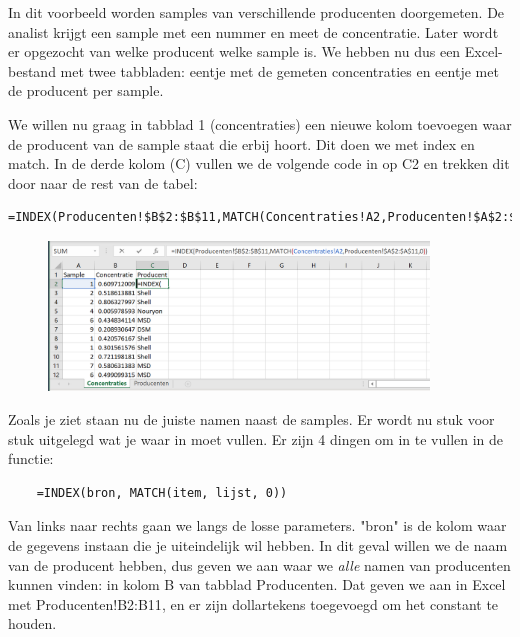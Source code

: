 \begin{figure}[h]
\begin{minipage}{0.45\textwidth}
    \end{minipage}
\end{figure}

In dit voorbeeld worden samples van verschillende producenten doorgemeten. De analist krijgt een sample met een nummer en meet de concentratie. Later wordt er opgezocht van welke producent welke sample is. We hebben nu dus een Excel-bestand met twee tabbladen: eentje met de gemeten concentraties en eentje met de producent per sample.

We willen nu graag in tabblad 1 (concentraties) een nieuwe kolom toevoegen waar de producent van de sample staat die erbij hoort. Dit doen we met index en match. In de derde kolom (C) vullen we de volgende code in op C2 en trekken dit door naar de rest van de tabel:
\begin{verbatim}
=INDEX(Producenten!$B$2:$B$11,MATCH(Concentraties!A2,Producenten!$A$2:$A$11,0))
\end{verbatim}
\begin{figure}[h]
\begin{center}
\includegraphics[width=0.9\textwidth]{img/index3.png}
\end{center}
\end{figure}

Zoals je ziet staan nu de juiste namen naast de samples. Er wordt nu stuk voor stuk uitgelegd wat je waar in moet vullen. Er zijn 4 dingen om in te vullen in de functie:

\begin{verbatim}
    =INDEX(bron, MATCH(item, lijst, 0))
\end{verbatim}
Van links naar rechts gaan we langs de losse parameters. "bron" is de kolom waar de gegevens instaan die je uiteindelijk wil hebben. In dit geval willen we de naam van de producent hebben, dus geven we aan waar we \textit{alle} namen van producenten kunnen vinden: in kolom B van tabblad Producenten. Dat geven we aan in Excel met \textsf{Producenten!B2:B11}, en er zijn dollartekens toegevoegd om het constant te houden. 

